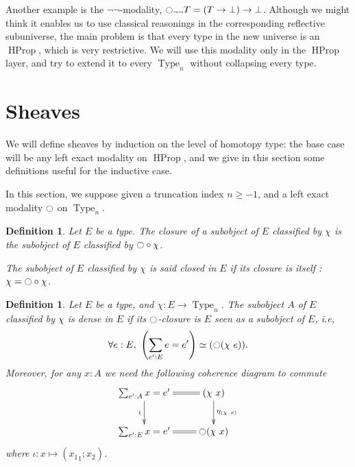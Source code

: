 \documentclass[conference]{IEEEtran}
\newtheorem{defi}[thm]{Definition}
\newcommand{\ie}{i.e,\xspace}
\DeclareMathOperator{\Type}{Type}
\DeclareMathOperator{\HProp}{HProp}
\newcommand{\modal}{\ensuremath{\ocircle}}
\begin{document}
Another example is the $\lnot\lnot$-modality, $\modal_{\lnot\lnot} T = (T
\to \bot) \to \bot$. Although we might think it enables us to use
classical reasonings in the corresponding reflective subuniverse, the
main problem is that every type in the new universe is an $\HProp$,
which is very restrictive. 
We will use this modality only in the $\HProp$ layer, and try to
extend it to every $\Type_n$ without collapsing every type.




\section{Sheaves}
\label{sec:sheaves}

We will define sheaves by induction on the level of homotopy type:
the base case will be any left exact modality on $\HProp$, and we
give in this section some definitions useful for the inductive case.


In this section, we suppose given a truncation index $n\geqslant -1$,
and a left exact modality $\modal$ on $\Type_n$.

\begin{defi}
  Let $E$ be a type. The {\em closure} of a subobject of $E$ classified by $\chi$
  is the subobject of $E$ classified by $\modal \circ \chi$.

  The subobject of $E$ classified by $\chi$ is said {\em closed in
    $E$} if its closure is itself : $\chi = \modal \circ \chi$.
\end{defi}

\begin{defi}
  Let $E$ be a type, and $\chi:E \to \Type_n$. The subobject $A$ of $E$
  classified by $\chi$ is {\em dense} in $E$ if its $\modal$-closure
  is $E$ seen as a subobject of $E$, \ie
  $$\forall e:E,~ \left(\sum_{e':E} e=e'\right) \simeq (\modal (\chi~e)).$$ 
  Moreover, for any $x:A$ we need the following coherence diagram to
  commute
  $$\xymatrix{
    \sum_{e':A} x = e' \ar@{=}[r] \ar[d]_\iota & (\chi~x) \ar[d]^{\eta_{(\chi~x)}}\\
    \sum_{e':E} x = e' \ar@{=}[r] & \modal (\chi~x)
  }$$
  where $\iota: x \mapsto ({x_1}_1 ; x_2)$.
\end{defi}
\end{document}
